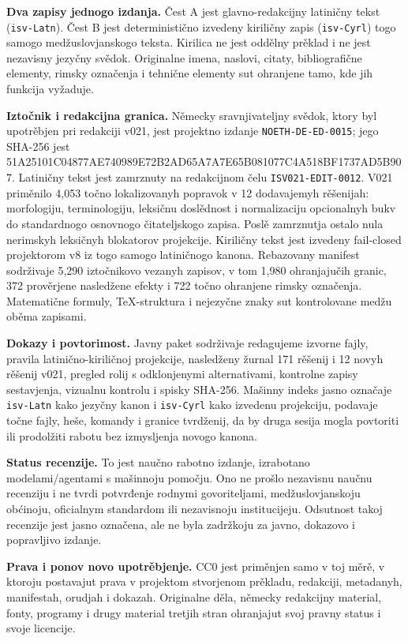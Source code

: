 \documentclass[11pt]{article}
\newcommand{\smallhash}[1]{{\ttfamily\footnotesize #1}}
\begin{document}
\textbf{Dva zapisy jednogo izdanja.} Čest A jest glavno-redakcijny latiničny tekst (\texttt{isv-Latn}). Čest B jest deterministično izvedeny kiriličny zapis (\texttt{isv-Cyrl}) togo samogo medžuslovjanskogo teksta. Kirilica ne jest oddělny prěklad i ne jest nezavisny jezyčny svědok. Originalne imena, naslovi, citaty, bibliografične elementy, rimsky označenja i tehnične elementy sut ohranjene tamo, kde jih funkcija vyžaduje.

\textbf{Iztočnik i redakcijna granica.} Německy sravnjivateljny svědok, ktory byl upotrěbjen pri redakciji v021, jest projektno izdanje \texttt{NOETH-DE-ED-0015}; jego SHA-256 jest
\smallhash{51A25101C04877AE740989E72B2AD65A7A7E65B081077C4A518BF1737AD5B907}.
Latiničny tekst jest zamrznuty na redakcijnom čelu \texttt{ISV021-EDIT-0012}. V021 priměnilo 4,053 točno lokalizovanyh popravok v 12 dodavajemyh rěšenijah: morfologiju, terminologiju, leksičnu doslědnost i normalizaciju opcionalnyh bukv do standardnogo osnovnogo čitateljskogo zapisa. Poslě zamrznutja ostalo nula nerimskyh leksičnyh blokatorov projekcije. Kiriličny tekst jest izvedeny fail-closed projektorom v8 iz togo samogo latiničnogo kanona. Rebazovany manifest sodrživaje 5,290 iztočnikovo vezanyh zapisov, v tom 1,980 ohranjajučih granic, 372 prověrjene nasledžene efekty i 722 točno ohranjene rimsky označenja. Matematične formuly, TeX-struktura i nejezyčne znaky sut kontrolovane medžu oběma zapisami.

\textbf{Dokazy i povtorimost.} Javny paket sodrživaje redagujeme izvorne fajly, pravila latinično-kiriličnoj projekcije, nasledženy žurnal 171 rěšenij i 12 novyh rěšenij v021, pregled rolij s odklonjenymi alternativami, kontrolne zapisy sestavjenja, vizualnu kontrolu i spisky SHA-256. Mašinny indeks jasno označaje \texttt{isv-Latn} kako jezyčny kanon i \texttt{isv-Cyrl} kako izvedenu projekciju, podavaje točne fajly, heše, komandy i granice tvrdženij, da by druga sesija mogla povtoriti ili prodolžiti rabotu bez izmysljenja novogo kanona.

\textbf{Status recenzije.} To jest naučno rabotno izdanje, izrabotano modelami/agentami s mašinnoju pomočju. Ono ne prošlo nezavisnu naučnu recenziju i ne tvrdi potvrđenje rodnymi govoriteljami, medžuslovjanskoju obćinoju, oficialnym standardom ili nezavisnoju institucijeju. Odsutnost takoj recenzije jest jasno označena, ale ne byla zadržkoju za javno, dokazovo i popravljivo izdanje.

\textbf{Prava i ponov novo upotrěbjenje.} CC0 jest priměnjen samo v toj měrě, v ktoroju postavajut prava v projektom stvorjenom prěkladu, redakciji, metadanyh, manifestah, orudjah i dokazah. Originalne děla, německy redakcijny material, fonty, programy i drugy material tretjih stran ohranjajut svoj pravny status i svoje licencije.
\end{document}
